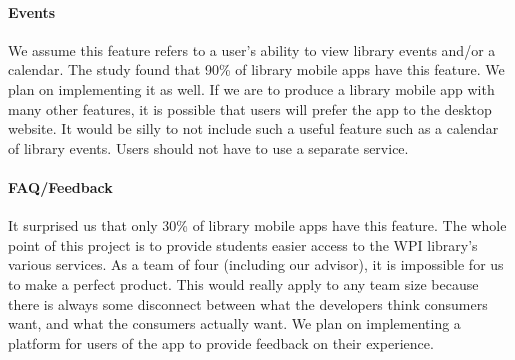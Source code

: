     \paragraph{Events}
    We assume this feature refers to a user's ability to view library events and/or a calendar. The study found that 90\% of library mobile apps have this feature. We plan on implementing it as well. If we are to produce a library mobile app with many other features, it is possible that users will prefer the app to the desktop website. It would be silly to not include such a useful feature such as a calendar of library events. Users should not have to use a separate service.
    \paragraph{FAQ/Feedback}
    It surprised us that only 30\% of library mobile apps have this feature. The whole point of this project is to provide students easier access to the WPI library's various services. As a team of four (including our advisor), it is impossible for us to make a perfect product. This would really apply to any team size because there is always some disconnect between what the developers think consumers want, and what the consumers actually want. We plan on implementing a platform for users of the \appname app to provide feedback on their experience.


